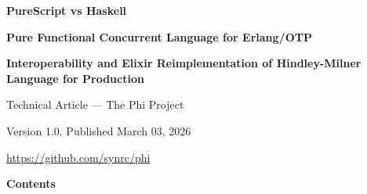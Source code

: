 \documentclass{article}
\newcommand\HUGE[1]{\fontsize{40}{40}\selectfont #1}
\begin{document}
\pagestyle{fancy}

\begin{titlepage}
  \AddToShipoutPictureBG*{\AtPageLowerLeft{\color{nato}\rule{\paperwidth}{\paperheight}}}
  \color{white}\thispagestyle{empty}\vspace*{4cm}\centering
  {\LARGE \textbf{PureScript vs Haskell} \par} \vspace{2cm}
  {\HUGE  \textbf{Pure Functional Concurrent Language for Erlang/OTP} \par} \vspace{0.8cm}
  {\LARGE \textbf{Interoperability and Elixir Reimplementation of Hindley-Milner Language for Production} \par} \vspace{2.5cm}
  {\large Technical Article --- The Phi Project \par} \vfill
  {\small Version 1.0. Published March 03, 2026 \par}
  {\small \url{https://github.com/synrc/phi} \par}
\end{titlepage}

\newpage

\begin{center}
  {\Huge\color{nato}\bfseries Contents\par}
\end{center}
\vspace{40pt}
\tableofcontents

\begin{abstract}
  PureScript and Haskell offer powerful Hindley-Milner type systems and pure functional
  paradigms that can replace classical imperative languages in production. However,
  neither natively targets the Erlang VM (BEAM), which excels in massive concurrency,
  fault tolerance, distribution, and soft real-time applications (telecom, IoT, 5G edge, etc.).
  This article compares PureScript and Haskell with a focus on their type-system
  internals and production trade-offs, but reframes the discussion around the ultimate goal:
  achieving full BEAM interoperability through a PureScript-like language fully reimplemented
  in Elixir (as pursued by the Phi project at https://github.com/synrc/phi). Phi combines
  HM-style static typing and functional expressiveness with native BEAM primitives, avoiding
  JavaScript or native-code limitations while inheriting Elixir/Erlang's battle-tested
  concurrency model.
\end{abstract}
\end{document}
